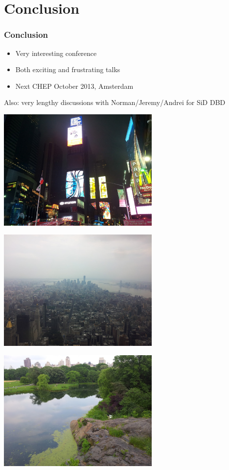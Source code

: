 \documentclass[handout]{beamer}
\begin{document}
\section{Conclusion}
\begin{frame}
\frametitle{Conclusion}
\begin{itemize}
  \item Very interesting conference
  \item Both exciting and frustrating talks
  \item Next CHEP October 2013, Amsterdam
\end{itemize}
Also: very lengthy discussions with Norman/Jeremy/Andrei for SiD DBD
\end{frame}

\begin{frame}
\begin{center}
\includegraphics[width=8cm]{timesquare}
\end{center}
\end{frame}
\begin{frame}
\begin{center}
\includegraphics[width=8cm]{Empire}
\end{center}
\end{frame}
\begin{frame}
\begin{center}
\includegraphics[width=8cm]{park}
\end{center}
\end{frame}
\end{document}
